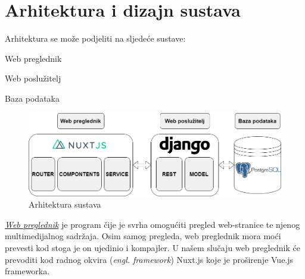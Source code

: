 \chapter{Arhitektura i dizajn sustava}
	Arhitektura se može podjeliti na sljedeće sustave:
	\begin{packed_item}
		\item 	Web preglednik
		\item 	Web poslužitelj
		\item 	Baza podataka
	\end{packed_item}	

	\begin{figure}[H]
		\centering
		\includegraphics[scale=0.45]{slike/ARHITEKTURA.PNG}
		\caption{Arhitektura sustava}
		\label{fig:promjene}
	\end{figure}	

	\underline{\textit{Web preglednik}} je program čije je svrha omogućiti pregled web-stranice te njenog multimedijalnog sadržaja. Osim samog pregleda, web preglednik mora moći prevesti kod stoga je on ujedinio i kompajler. U našem slučaju web preglednik će prevoditi kod radnog okvira (\emph{engl. framework}) Nuxt.js koje je proširenje Vue.js frameworka.

